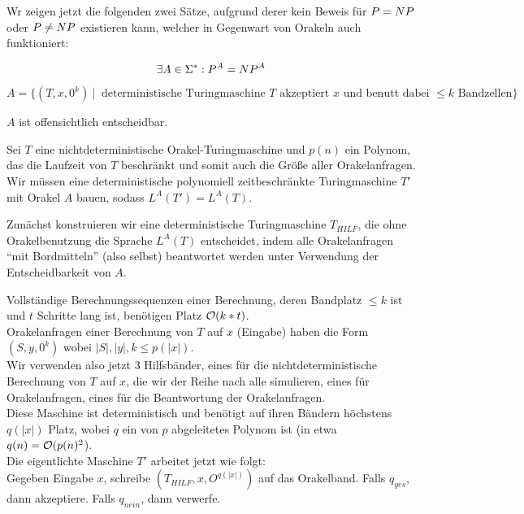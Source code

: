 Wr zeigen jetzt die folgenden zwei Sätze, aufgrund derer kein Beweis für $P = NP$ oder $P \neq NP$ existieren kann, welcher in Gegenwart von Orakeln auch funktioniert:

\begin{satz}
    
    $$ \exists A \in \Sigma^\ast: P^A = NP^A $$

\end{satz}

\begin{beweis}
    
    $A = \{ ( T, x, 0^k )  \ |\  
        \text{ deterministische Turingmaschine } T \text{ akzeptiert } x \text{ und benutt dabei } \leq k \text{ Bandzellen}  \}
    $

    $A$ ist offensichtlich entscheidbar.

    Sei $T$ eine nichtdeterministische Orakel-Turingmaschine und $p(n)$ ein Polynom, das die Laufzeit von $T$ beschränkt und somit auch die Größe aller Orakelanfragen.\\
    Wir müssen eine deterministische polynomiell zeitbeschränkte Turingmaschine $T'$ mit Orakel $A$ bauen, sodass $L^A(T') = L^A(T)$.

    Zunächst konstruieren wir eine deterministische Turingmaschine $T_{HILF}$, die ohne Orakelbenutzung die Sprache $L^A(T)$ entscheidet, indem alle Orakelanfragen ``mit Bordmitteln'' (also selbst) beantwortet werden unter Verwendung der Entscheidbarkeit von $A$.

    Vollständige Berechnungssequenzen einer Berechnung, deren Bandplatz $\leq k$ ist und $t$ Schritte lang ist, benötigen Platz $\mathcal{O}(k*t)$.\\
    Orakelanfragen einer Berechnung von $T$ auf $x$ (Eingabe) haben die Form $(S, y, 0^k)$ wobei $|S|, |y|, k \leq p(|x|)$.\\
    Wir verwenden also jetzt 3 Hilfsbänder, eines für die nichtdeterministische Berechnung von $T$ auf $x$, die wir der Reihe nach alle simulieren, eines für Orakelanfragen, eines für die Beantwortung der Orakelanfragen.\\
    Diese Maschine ist deterministisch und benötigt auf ihren Bändern höchstens $q(|x|)$ Platz, wobei $q$ ein von $p$ abgeleitetes Polynom ist (in etwa $q(n) = \mathcal{O}(p(n)^2$).\\

    Die eigentlichte Maschine $T'$ arbeitet jetzt wie folgt:\\
    Gegeben Eingabe $x$, schreibe $(T_{HILF}, x, O^{q(|x|)})$ auf das Orakelband. Falls $q_{yes}$, dann akzeptiere. Falls $q_{nein}$, dann verwerfe.

\end{beweis}


